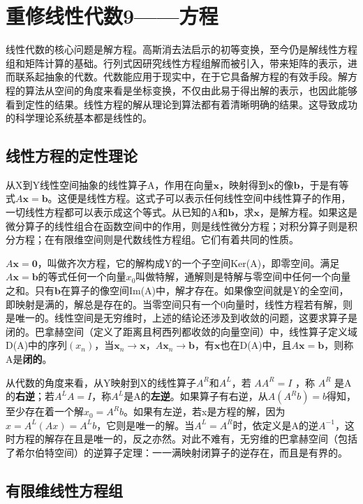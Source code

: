 \chapter{重修线性代数9——方程}

线性代数的核心问题是解方程。高斯消去法启示的初等变换，至今仍是解线性方程组和矩阵计算的基础。行列式因研究线性方程组解而被引入，带来矩阵的表示，进而联系起抽象的代数。代数能应用于现实中，在于它具备解方程的有效手段。解方程的算法从空间的角度来看是坐标变换，不仅由此易于得出解的表示，也因此能够看到定性的结果。线性方程的解从理论到算法都有着清晰明确的结果。这导致成功的科学理论系统基本都是线性的。

\section{线性方程的定性理论}

从X到Y线性空间抽象的线性算子A，作用在向量$ \mathbf{x} $，映射得到$ \mathbf{x} $的像$ \mathbf{b} $，于是有等式$ A\mathbf{x}=\mathbf{b} $。这便是线性方程。这式子可以表示任何线性空间中线性算子的作用，一切线性方程都可以表示成这个等式。从已知的A和$ \mathbf{b} $，求$ \mathbf{x} $，是解方程。如果这是微分算子的线性组合在函数空间中的作用，则是线性微分方程；对积分算子则是积分方程；在有限维空间则是代数线性方程组。它们有着共同的性质。

$ A\mathbf{x}=\mathbf{0} $，叫做齐次方程，它的解构成Y的一个子空间Ker(A)，即零空间。满足$ A\mathbf{x}=\mathbf{b} $的等式任何一个向量$ x_0 $叫做特解，通解则是特解与零空间中任何一个向量之和。只有$ \mathbf{b} $在算子的像空间Im(A)中，解才存在。如果像空间就是Y的全空间，即映射是满的，解总是存在的。当零空间只有一个0向量时，线性方程若有解，则是唯一的。线性空间是无穷维时，上述的结论还涉及到收敛的问题，这要求算子是闭的。巴拿赫空间（定义了距离且柯西列都收敛的向量空间）中，线性算子定义域D(A)中的序列$ (x_n) $，当$ \mathbf{x}_n\rightarrow \mathbf{x} ，A\mathbf{x}_n\rightarrow\mathbf{b}$，有$ \mathbf{x} $也在D(A)中，且$ A\mathbf{x}=\mathbf{b} $，则称A是\textbf{闭的}。

从代数的角度来看，从Y映射到X的线性算子$ A^R $和$ A^L $，若 $ AA^R= I $ ，称 $ A^R $ 是A的\textbf{右逆}；若$ A^LA=I $，称$ A^L $是A的\textbf{左逆}。如果算子有右逆，从$ A(A^R b)= b $得知，至少存在着一个解$ x_0=A^Rb $。如果有左逆，若x是方程的解，因为$ x=A^L(Ax)=A^Lb $，它则是唯一的解。当$ A^L=A^R $时，依定义是A的逆$ A^{-1} $，这时方程的解存在且是唯一的，反之亦然。对此不难有，无穷维的巴拿赫空间（包括了希尔伯特空间）的逆算子定理：一一满映射闭算子的逆存在，而且是有界的。

\section{有限维线性方程组}

